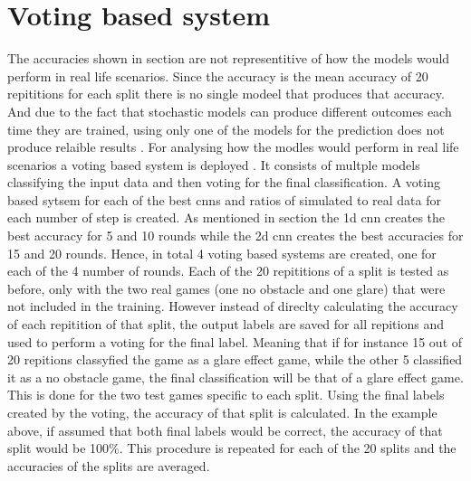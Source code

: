 \chapter{Voting based system}
The accuracies shown in section  are not representitive of how the models would perform in real life scenarios. Since the accuracy is the mean accuracy of 20 repititions for each split there is no single modeel that produces that accuracy. And due to the fact that stochastic models can produce different outcomes each time they are trained, using only one of the models for the prediction does not produce relaible results . For analysing how the modles would perform in real life scenarios a voting based system is deployed . It consists of multple models classifying the input data and then voting for the final classification. A voting based sytsem for each of the best cnns and ratios of simulated to real data for each number of step is created. As mentioned in section  the 1d cnn creates the best accuracy for 5 and 10 rounds while the 2d cnn creates the best accuracies for 15 and 20 rounds. Hence, in total 4 voting based systems are created, one for each of the 4 number of rounds.  Each of the 20 repititions of a split is tested as before, only with the two real games (one no obstacle and one glare) that were not included in the training. However instead of direclty calculating the accuracy of each repitition of that split, the output labels are saved for all repitions and used to perform a voting for the final label. Meaning that if for instance 15 out of 20 repitions classyfied the game as a glare effect game, while the other 5 classified it as a no obstacle game, the final classification will be that of a glare effect game. This is done for the two test games specific to each split. Using the final labels created by the voting, the accuracy of that split is calculated. In the example above, if assumed that both final labels would be correct, the accuracy of that split would be 100\%. This procedure is repeated for each of the 20 splits and the accuracies of the splits are averaged. 

